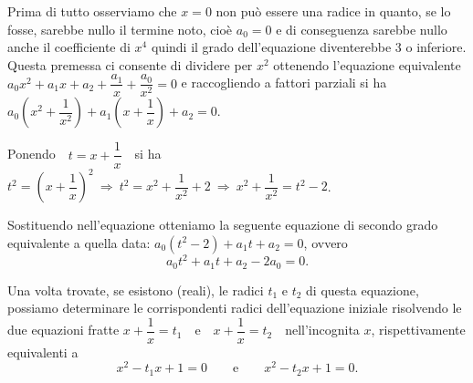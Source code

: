 Prima di tutto osserviamo che $x=0$ non può essere una radice in quanto, se lo fosse, sarebbe nullo il termine noto, cioè $a_0=0$ e di conseguenza sarebbe nullo anche il coefficiente di $x^{4}$ quindi il grado dell'equazione diventerebbe 3 o inferiore. Questa premessa ci consente di dividere per $x^2$ ottenendo l'equazione equivalente $a_0 x^2+a_1x+a_2+\dfrac{a_1} x+\dfrac{a_0}{x^2}=0$ e raccogliendo a fattori parziali si ha $a_0\left(x^2+\dfrac 1{x^2}\right)+a_1\left(x+\dfrac 1 x\right)+a_2=0$.

Ponendo~~$t=x+\dfrac 1 x$~~si ha~~$t^2=\left(x+\dfrac 1 x\right)^2\:\Rightarrow\: t^2=x^2+\dfrac 1{x^2}+2 \:\Rightarrow\: x^2+\dfrac 1{x^2}=t^2-2$.

Sostituendo nell'equazione otteniamo la seguente equazione di secondo grado equivalente a quella data: $a_0\left(t^2-2\right)+a_1t+a_2=0$, ovvero
\[a_0t^2+a_1t+a_2-2a_0=0.\]

Una volta trovate, se esistono (reali), le radici $t_1$ e $t_2$ di questa equazione, possiamo determinare le corrispondenti radici dell'equazione iniziale risolvendo le due equazioni fratte $x+\dfrac 1 x=t_1$~~e~~$x+\dfrac 1 x=t_2$~~nell'incognita $x$, rispettivamente equivalenti a
\[x^2-t_1x+1=0\qquad\text{e}\qquad {x}^2-t_2x+1=0.\]

